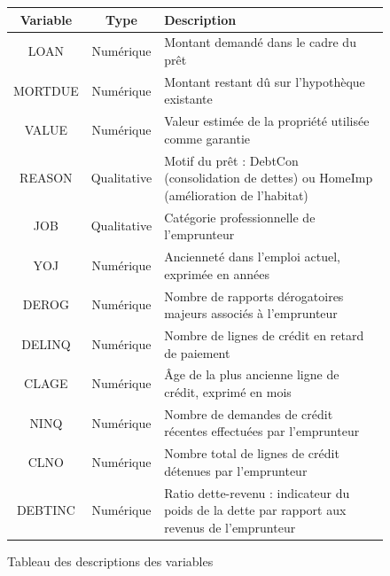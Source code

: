 \documentclass[a4paper,12pt]{report}
\begin{document}
\begin{figure}[h!]
  \begin{center}
    \begin{tabular}{||c c p{10cm}||} 
     \hline
     Variable & Type & Description \\ [0.5ex] 
     \hline\hline
     LOAN & Numérique & Montant demandé dans le cadre du prêt \\ 
     \hline
     MORTDUE & Numérique & Montant restant dû sur l’hypothèque existante \\
     \hline
     VALUE & Numérique & Valeur estimée de la propriété utilisée comme garantie \\
     \hline
     REASON & Qualitative & Motif du prêt : DebtCon (consolidation de dettes) ou HomeImp (amélioration de l’habitat) \\
     \hline
     JOB & Qualitative & Catégorie professionnelle de l’emprunteur \\
     \hline
     YOJ & Numérique & Ancienneté dans l’emploi actuel, exprimée en années \\
     \hline
     DEROG & Numérique & Nombre de rapports dérogatoires majeurs associés à l’emprunteur \\
     \hline
     DELINQ & Numérique & Nombre de lignes de crédit en retard de paiement \\
     \hline
     CLAGE & Numérique & Âge de la plus ancienne ligne de crédit, exprimé en mois \\
     \hline
     NINQ & Numérique & Nombre de demandes de crédit récentes effectuées par l’emprunteur \\
     \hline
     CLNO & Numérique & Nombre total de lignes de crédit détenues par l’emprunteur \\
     \hline
     DEBTINC & Numérique & Ratio dette-revenu : indicateur du poids de la dette par rapport aux revenus de l’emprunteur \\ [1ex] 
     \hline
    \end{tabular}
  \end{center}
  \caption{Tableau des descriptions des variables}
  \label{fig:tab_vif_num_num}
\end{figure}
\end{document}
